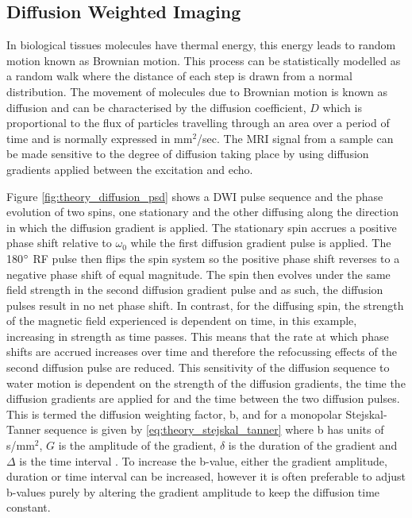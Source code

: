 \subsection{Diffusion Weighted Imaging}
\label{subsec:theory_diffusion}
In biological tissues molecules have thermal energy, this energy leads to random motion known as Brownian motion. This process can be statistically modelled as a random walk where the distance of each step is drawn from a normal distribution. The movement of molecules due to Brownian motion is known as diffusion and can be characterised by the diffusion coefficient, $D$ which is proportional to the flux of particles travelling through an area over a period of time and is normally expressed in mm$^2$/sec. The \ac{MRI} signal from a sample can be made sensitive to the degree of diffusion taking place by using diffusion gradients applied between the excitation and echo. 

Figure \ref{fig:theory_diffusion_psd} shows a \ac{DWI} pulse sequence and the phase evolution of two spins, one stationary and the other diffusing along the direction in which the diffusion gradient is applied. The stationary spin accrues a positive phase shift relative to $\omega_0$ while the first diffusion gradient pulse is applied. The 180$\degree$ \ac{RF} pulse then flips the spin system so the positive phase shift reverses to a negative phase shift of equal magnitude. The spin then evolves under the same field strength in the second diffusion gradient pulse and as such, the diffusion pulses result in no net phase shift. In contrast, for the diffusing spin, the strength of the magnetic field experienced is dependent on time, in this example, increasing in strength as time passes. This means that the rate at which phase shifts are accrued increases over time and therefore the refocussing effects of the second diffusion pulse are reduced. This sensitivity of the diffusion sequence to water motion is dependent on the strength of the diffusion gradients, the time the diffusion gradients are applied for and the time between the two diffusion pulses. This is termed the diffusion weighting factor, b, and for a monopolar Stejskal-Tanner sequence is given by \eqref{eq:theory_stejskal_tanner} where b has units of s/mm$^2$, $G$ is the amplitude of the gradient, $\delta$ is the duration of the gradient and $\Delta$ is the time interval \cite{stejskal_spin_1965}. To increase the b-value, either the gradient amplitude, duration or time interval can be increased, however it is often preferable to adjust b-values purely by altering the gradient amplitude to keep the diffusion time constant.

